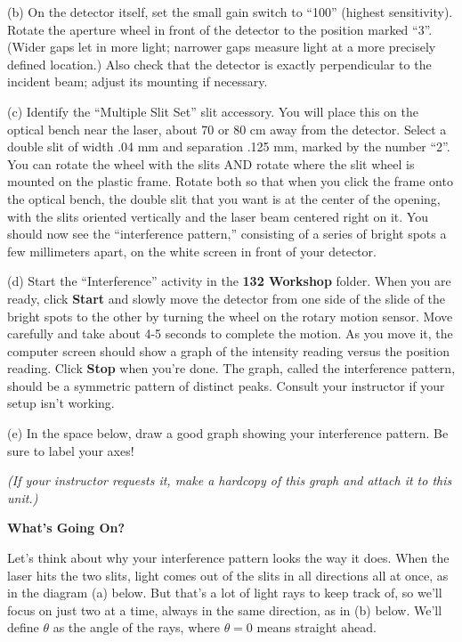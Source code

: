 
(b) On the detector itself, set the small gain switch to ``100'' (highest sensitivity).  Rotate the aperture wheel in front of the detector to the position marked ``3''.  (Wider gaps let in more light; narrower gaps measure light at a more precisely defined location.)  Also check that the detector is exactly perpendicular to the incident beam; adjust its mounting if necessary.


(c) Identify the ``Multiple Slit Set'' slit accessory.  You will place this on the optical bench near the laser, about 70 or 80 cm away from the detector.  Select a double slit of width .04 mm and separation .125 mm, marked by the number ``2''. You can rotate the wheel with the slits AND rotate where the slit wheel is mounted on the plastic frame.  
Rotate both so that when you click the frame onto the optical bench, the double slit that you want is at the center of the opening, with the slits oriented vertically and the laser beam centered right on it.  You should now see the ``interference pattern,'' consisting of a series of bright spots a few millimeters apart, on the white screen in front of your detector.


(d) Start the ``Interference'' activity in the {\bf 132 Workshop} folder. 
When you are ready, click {\bf Start} and slowly move the detector 
from one side of the slide of the bright spots to the other by turning the wheel on the rotary 
motion sensor. Move carefully and take about 4-5 seconds to complete the 
motion. 
As you move it, the computer screen should show a graph of the intensity reading versus the position reading. 
Click {\bf Stop} when you're done. 
The graph, called the interference pattern, should be a symmetric pattern of distinct peaks. Consult your instructor if your setup isn't working.

\pagebreak[2]
(e) In the space below, draw a good graph showing your interference pattern.  
Be sure to label your axes!
\answerspace{1.5in}

\textit{(If your instructor requests it, make a hardcopy of this graph and attach it to this unit.)}

\textbf{What's Going On?}

Let's think about why your interference pattern looks the way it does.  When the laser hits the two slits, 
light comes out of the slits in all directions all at once, as in the diagram (a) below.  
But that's a lot of light rays to keep track of, so we'll focus on just two at a time, always in the same direction, as in (b) below.
We'll define $\theta$ as the angle of the rays, where $\theta=0$ means straight ahead.  

